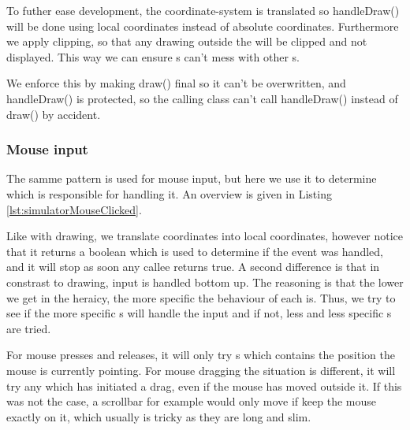 

To futher ease development, the coordinate-system is translated so handleDraw()
will be done using local coordinates instead of absolute coordinates.
Furthermore we apply clipping, so that any drawing outside the 
will be clipped and not displayed. This way we can ensure s
can't mess with other s.

We enforce this by making draw() final so it can't be overwritten, and
handleDraw() is protected, so the calling class can't call handleDraw() instead
of draw() by accident.

\subsubsection{Mouse input}

The samme pattern is used for mouse input, but here we use it to determine which
 is responsible for handling it. An overview is given in
Listing \ref{lst:simulatorMouseClicked}.



Like with drawing, we translate coordinates into local coordinates, however
notice that it returns a boolean which is used to determine if the event was
handled, and it will stop as soon any callee returns true. A second difference
is that in constrast to drawing, input is handled bottom up. The reasoning is
that the lower we get in the heraicy, the more specific the behaviour of each
 is. Thus, we try to see if the more specific
s will handle the input and if not, less and less specific
s are tried.

For mouse presses and releases, it will only try s which
contains the position the mouse is currently pointing. For mouse dragging the
situation is different, it will try any  which has initiated a
drag, even if the mouse has moved outside it. If this was not the case, a
scrollbar for example would only move if keep the mouse exactly on it, which
usually is tricky as they are long and slim.

